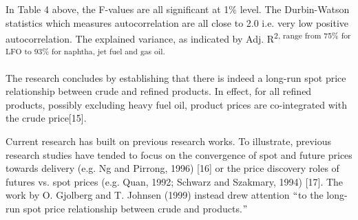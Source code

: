 \documentclass[12pt,twoside]{article}
\begin{document}

\begin{justify}
{\fontsize{11pt}{13.2pt}\selectfont \par}
\end{justify}\par

\begin{justify}
{\fontsize{11pt}{13.2pt}\selectfont In Table 4 above, the F-values are all significant at 1$\%$  level. The Durbin-Watson statistics which measures autocorrelation are all close to 2.0 i.e. very low positive autocorrelation. The explained variance, as indicated by Adj. R\textsuperscript{2, range from 75$\%$  for LFO to 93$\%$  for naphtha, jet fuel and gas oil.}\par}
\end{justify}\par

\begin{justify}
{\fontsize{11pt}{13.2pt}\selectfont The research concludes by establishing that there is indeed a long-run spot price relationship between crude and refined products. In effect, for all refined products, possibly excluding heavy fuel oil, product prices are co-integrated with the crude price[15].\par}
\end{justify}\par

{\fontsize{11pt}{13.2pt}\selectfont \par}
\par

\begin{justify}
{\fontsize{11pt}{13.2pt}\selectfont Current research has built on previous research works. To illustrate, previous research studies have tended to focus on the convergence of spot and future prices towards delivery (e.g. Ng and Pirrong, 1996) \textcolor[HTML]{FF0000}{[16] or the price discovery roles of futures vs. spot prices (e.g. Quan, 1992; Schwarz and Szakmary, 1994) [17]. The work by O. Gjolberg and T. Johnsen (1999) instead drew attention $``$to the long-run spot price relationship between crude and products.$"$ }\par}
\end{justify}\par
\end{document}

